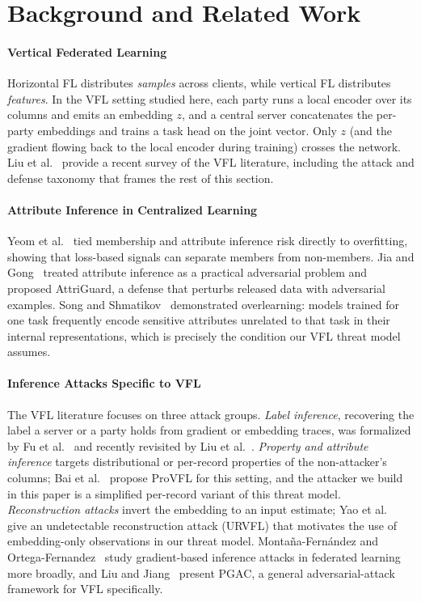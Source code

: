 \documentclass[sigconf,anonymous]{acmart}
\begin{document}
\section{Background and Related Work}

\paragraph{Vertical Federated Learning}
Horizontal FL distributes \emph{samples} across clients, while vertical FL distributes \emph{features}. In the VFL setting studied here, each party runs a local encoder over its columns and emits an embedding $z$, and a central server concatenates the per-party embeddings and trains a task head on the joint vector. Only $z$ (and the gradient flowing back to the local encoder during training) crosses the network. Liu et al.~\cite{liu2024vfl} provide a recent survey of the VFL literature, including the attack and defense taxonomy that frames the rest of this section.

\paragraph{Attribute Inference in Centralized Learning}
Yeom et al.~\cite{yeom2018privacy} tied membership and attribute inference risk directly to overfitting, showing that loss-based signals can separate members from non-members. Jia and Gong~\cite{jia2018attriguard} treated attribute inference as a practical adversarial problem and proposed AttriGuard, a defense that perturbs released data with adversarial examples. Song and Shmatikov~\cite{song2020overlearning} demonstrated overlearning: models trained for one task frequently encode sensitive attributes unrelated to that task in their internal representations, which is precisely the condition our VFL threat model assumes.

\paragraph{Inference Attacks Specific to VFL}
The VFL literature focuses on three attack groups. \emph{Label inference}, recovering the label a server or a party holds from gradient or embedding traces, was formalized by Fu et al.~\cite{fu2022label} and recently revisited by Liu et al.~\cite{liu2026revisiting}. \emph{Property and attribute inference} targets distributional or per-record properties of the non-attacker's columns; Bai et al.~\cite{bai2025provfl} propose ProVFL for this setting, and the attacker we build in this paper is a simplified per-record variant of this threat model. \emph{Reconstruction attacks} invert the embedding to an input estimate; Yao et al.~\cite{yao2025urvfl} give an undetectable reconstruction attack (URVFL) that motivates the use of embedding-only observations in our threat model. Monta\~{n}a-Fern\'{a}ndez and Ortega-Fernandez~\cite{montana2025gradient} study gradient-based inference attacks in federated learning more broadly, and Liu and Jiang~\cite{liu2025pgac} present PGAC, a general adversarial-attack framework for VFL specifically.
\end{document}
